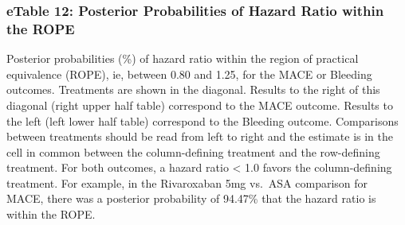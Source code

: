 \documentclass[
  12pt,
]{article}
\begin{document}
\begin{landscape}
\hypertarget{etable-12-posterior-probabilities-of-hazard-ratio-within-the-rope}{%
\subsubsection{eTable 12: Posterior Probabilities of Hazard Ratio within
the
ROPE}\label{etable-12-posterior-probabilities-of-hazard-ratio-within-the-rope}}

\begin{table}[!h]
\centering
{}
\end{table}

Posterior probabilities (\%) of hazard ratio within the region of
practical equivalence (ROPE), ie, between 0.80 and 1.25, for the MACE or
Bleeding outcomes. Treatments are shown in the diagonal. Results to the
right of this diagonal (right upper half table) correspond to the MACE
outcome. Results to the left (left lower half table) correspond to the
Bleeding outcome. Comparisons between treatments should be read from
left to right and the estimate is in the cell in common between the
column-defining treatment and the row-defining treatment. For both
outcomes, a hazard ratio \textless{} 1.0 favors the column-defining
treatment. For example, in the Rivaroxaban 5mg vs.~ASA comparison for
MACE, there was a posterior probability of 94.47\% that the hazard ratio
is within the ROPE.


\end{landscape}
\end{document}
